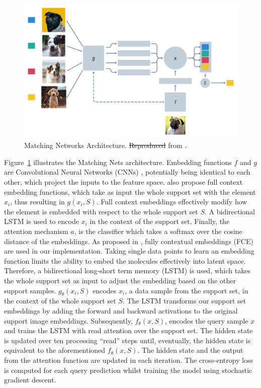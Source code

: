 \documentclass[journal=jcisd8,manuscript=article]{achemso} %
\providecommand{\DIFadd}[1]{{\protect\color{blue}\uwave{#1}}} %
\providecommand{\DIFdel}[1]{{\protect\color{red}\sout{#1}}}                      %
\providecommand{\DIFaddFL}[1]{\DIFadd{#1}} %
\providecommand{\DIFdelFL}[1]{\DIFdel{#1}} %
\providecommand{\DIFaddbeginFL}{} %
\providecommand{\DIFaddendFL}{} %
\providecommand{\DIFdelbeginFL}{} %
\providecommand{\DIFdelendFL}{} %
\begin{document}
\begin{figure}[!ht]
    \centering
    \DIFdelbeginFL %
\DIFdelendFL \DIFaddbeginFL \includegraphics[width=0.7\linewidth]{img/matching_networks_adapt.png}
    \DIFaddendFL \caption[Matching Networks Architecture]{Matching Networks Architecture. \DIFdelbeginFL \DIFdelFL{Reproduced }\DIFdelendFL \DIFaddbeginFL \DIFaddFL{Adapted }\DIFaddendFL from \citet{vinyals2016matching}.}
    \label{fig:matchingnets}
\end{figure}

Figure~\ref{fig:matchingnets} illustrates the Matching Nets architecture. Embedding functions $f$ and $g$ are Convolutional Neural Networks (CNNs) \citep{lecun1995convolutional}, potentially being identical to each other, which project the inputs to the feature space. \citet{vinyals2016matching} also propose full context embedding functions, which take as input the whole support set with the element $x_i$, thus resulting in \( g(x_i, S) \). Full context embeddings effectively modify how the element is embedded with respect to the whole support set $S$. A bidirectional LSTM is used to encode $x_i$ in the context of the support set. Finally, the attention mechanism $a$, is the classifier which takes a softmax over the cosine distance of the embeddings. As proposed in \citet{vinyals2016matching}, fully contextual embeddings (FCE) are used in our implementation. Taking single data points to learn an embedding function limits the ability to embed the molecules effectively into latent space. Therefore, a bidirectional long-short term memory (LSTM) is used, which takes the whole support set as input to adjust the embedding based on the other support samples. $g_\theta(x_i, S)$ encodes $x_i$, a data sample from the support set, in the context of the whole support set $S$. The LSTM transforms our support set embeddings by adding the forward and backward activations to the original support image embeddings. Subsequently, $f_\theta(x, S)$, encodes the query sample $x$ and trains the LSTM with read attention over the support set. The hidden state is updated over ten processing ``read'' steps until, eventually, the hidden state is equivalent to the aforementioned $f_\theta(x, S)$. The hidden state and the output from the attention function are updated in each iteration. The cross-entropy loss is computed for each query prediction whilst training the model using stochastic gradient descent.
\end{document}
